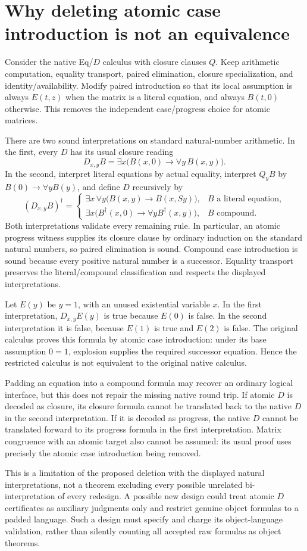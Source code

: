 \section{Why deleting atomic case introduction is not an equivalence}

Consider the native Eq/$D$ calculus with closure clauses $Q$. Keep
arithmetic computation, equality transport, paired elimination, closure
specialization, and identity/availability. Modify paired introduction so
that its local assumption is always $E(t,z)$ when the matrix is a literal
equation, and always $B(t,0)$ otherwise. This removes the independent
case/progress choice for atomic matrices.

There are two sound interpretations on standard natural-number arithmetic.
In the first, every $D$ has its usual closure reading
\[
  D_{x,y}B=\exists x\bigl(B(x,0)\to\forall y\,B(x,y)\bigr).
\]
In the second, interpret literal equations by actual equality, interpret
$Q_yB$ by $B(0)\to\forall yB(y)$, and define $D$ recursively by
\[
 (D_{x,y}B)^\dagger=
 \begin{cases}
 \exists x\,\forall y\bigl(B(x,y)\to B(x,Sy)\bigr),
   &B\text{ a literal equation},\\
 \exists x\bigl(B^\dagger(x,0)\to\forall yB^\dagger(x,y)\bigr),
   &B\text{ compound}.
 \end{cases}
\]
Both interpretations validate every remaining rule. In particular, an
atomic progress witness supplies its closure clause by ordinary induction
on the standard natural numbers, so paired elimination is sound.
Compound case introduction is sound because every positive natural number
is a successor. Equality transport preserves the literal/compound
classification and respects the displayed interpretations.

Let $E(y)$ be $y=1$, with an unused existential variable $x$. In the first
interpretation, $D_{x,y}E(y)$ is true because $E(0)$ is false. In the second
interpretation it is false, because $E(1)$ is true and $E(2)$ is false.
The original calculus proves this formula by atomic case introduction:
under its base assumption $0=1$, explosion supplies the required successor
equation. Hence the restricted calculus is not equivalent to the original
native calculus.

Padding an equation into a compound formula may recover an ordinary
logical interface, but this does not repair the missing native round trip.
If atomic $D$ is decoded as closure, its closure formula cannot be
translated back to the native $D$ in the second interpretation. If it is
decoded as progress, the native $D$ cannot be translated forward to its
progress formula in the first interpretation. Matrix congruence with an
atomic target also cannot be assumed: its usual proof uses precisely the
atomic case introduction being removed.

This is a limitation of the proposed deletion with the displayed natural
interpretations, not a theorem excluding every possible unrelated
bi-interpretation of every redesign. A possible new design could treat
atomic $D$ certificates as auxiliary judgments only and restrict genuine
object formulas to a padded language. Such a design must specify and
charge its object-language validation, rather than silently counting all
accepted raw formulas as object theorems.
